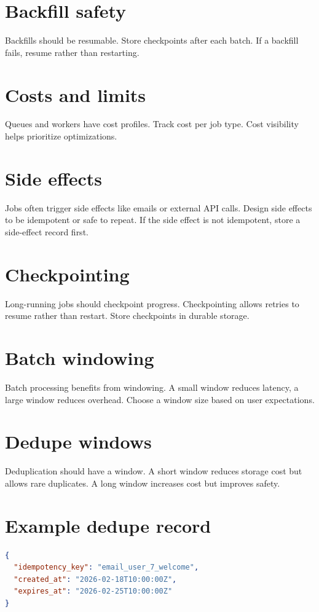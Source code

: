 \section{Backfill safety}
Backfills should be resumable.
Store checkpoints after each batch.
If a backfill fails, resume rather than restarting.

\section{Costs and limits}
Queues and workers have cost profiles.
Track cost per job type.
Cost visibility helps prioritize optimizations.

\section{Side effects}
Jobs often trigger side effects like emails or external API calls.
Design side effects to be idempotent or safe to repeat.
If the side effect is not idempotent, store a side-effect record first.

\section{Checkpointing}
Long-running jobs should checkpoint progress.
Checkpointing allows retries to resume rather than restart.
Store checkpoints in durable storage.

\section{Batch windowing}
Batch processing benefits from windowing.
A small window reduces latency, a large window reduces overhead.
Choose a window size based on user expectations.

\section{Dedupe windows}
Deduplication should have a window.
A short window reduces storage cost but allows rare duplicates.
A long window increases cost but improves safety.

\section{Example dedupe record}
\begin{lstlisting}[language=JSON]
{
  "idempotency_key": "email_user_7_welcome",
  "created_at": "2026-02-18T10:00:00Z",
  "expires_at": "2026-02-25T10:00:00Z"
}
\end{lstlisting}

